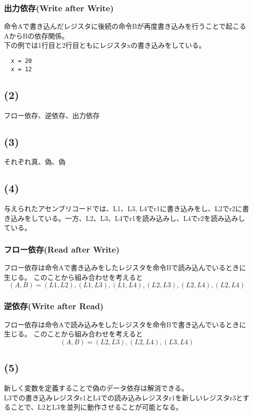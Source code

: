 \documentclass[a4paper,12pt,xelatex,ja=standard]{bxjsarticle}
\begin{document}
\subsubsection*{出力依存(Write after Write)}
命令Aで書き込んだレジスタに後続の命令Bが再度書き込みを行うことで起こるAからBの依存関係。\\
下の例では1行目と2行目ともにレジスタxの書き込みをしている。
\begin{lstlisting}
  x = 20
  x = 12
\end{lstlisting}

\subsection*{(2)}
フロー依存、逆依存、出力依存

\subsection*{(3)}
それぞれ真、偽、偽

\subsection*{(4)}
与えられたアセンブリコードでは、L1、L3, L4でr1に書き込みをし、L2でr2に書き込みをしている。一方、L2、L3、L4でr1を読み込みし、L4でr2を読み込みしている。\\
\subsubsection*{フロー依存(Read after Write)}
フロー依存は命令Aで書き込みをしたレジスタを命令Bで読み込んでいるときに生じる。
このことから組み合わせを考えると
\[
  (A, B) = (L1, L2), (L1, L3), (L1, L4), (L2, L3), (L2, L4), (L2, L4)
\]

\subsubsection*{逆依存(Write after Read)}
フロー依存は命令Aで読み込みをしたレジスタを命令Bで書き込んでいるときに生じる。
このことから組み合わせを考えると
\[
  (A, B) = (L2, L3), (L2, L4), (L3, L4)
\]

\subsection*{(5)}
新しく変数を定義することで偽のデータ依存は解消できる。\\
L3での書き込みレジスタr1とL4での読み込みレジスタr1を新しいレジスタr3とすることで、L2とL3を並列に動作させることが可能となる。
\end{document}
